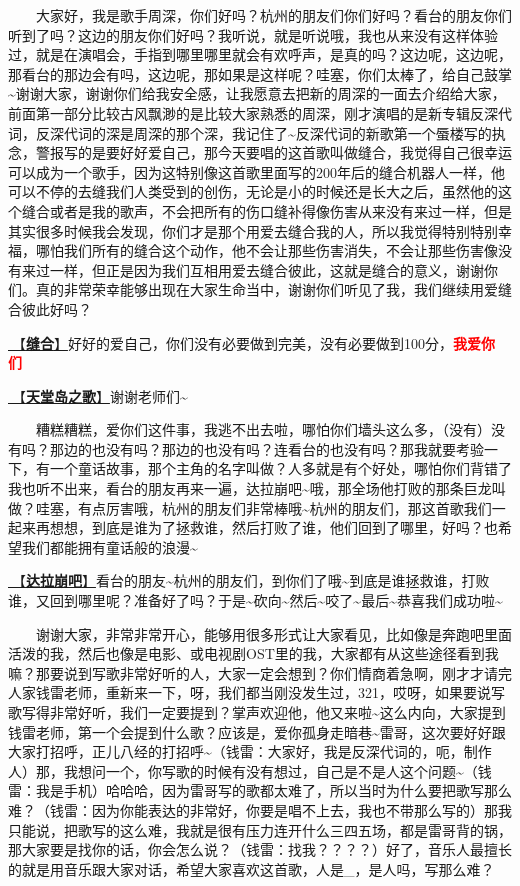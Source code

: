 \documentclass[]{ctexbook}
\begin{document}
  大家好，我是歌手周深，你们好吗？杭州的朋友们你们好吗？看台的朋友你们听到了吗？这边的朋友你们好吗？我听说，就是听说哦，我也从来没有这样体验过，就是在演唱会，手指到哪里哪里就会有欢呼声，是真的吗？这边呢，这边呢，那看台的那边会有吗，这边呢，那如果是这样呢？哇塞，你们太棒了，给自己鼓掌\textasciitilde 谢谢大家，谢谢你们给我安全感，让我愿意去把新的周深的一面去介绍给大家，前面第一部分比较古风飘渺的是比较大家熟悉的周深，刚才演唱的是新专辑反深代词，反深代词的深是周深的那个深，我记住了\textasciitilde 反深代词的新歌第一个蜃楼写的执念，警报写的是要好好爱自己，那今天要唱的这首歌叫做缝合，我觉得自己很幸运可以成为一个歌手，因为这特别像这首歌里面写的200年后的缝合机器人一样，他可以不停的去缝我们人类受到的创伤，无论是小的时候还是长大之后，虽然他的这个缝合或者是我的歌声，不会把所有的伤口缝补得像伤害从来没有来过一样，但是其实很多时候我会发现，你们才是那个用爱去缝合我的人，所以我觉得特别特别幸福，哪怕我们所有的缝合这个动作，他不会让那些伤害消失，不会让那些伤害像没有来过一样，但正是因为我们互相用爱去缝合彼此，这就是缝合的意义，谢谢你们。真的非常荣幸能够出现在大家生命当中，谢谢你们听见了我，我们继续用爱缝合彼此好吗？

\hyperref[fix-you]{🎵【\textbf{缝合}】}好好的爱自己，你们没有必要做到完美，没有必要做到100分，\textbf{\textcolor{red}{我爱你们~} }

\hyperref[haven-song]{🎵【\textbf{天堂岛之歌}】}谢谢老师们\textasciitilde{}

  糟糕糟糕，爱你们这件事，我逃不出去啦，哪怕你们墙头这么多，（没有）没有吗？那边的也没有吗？那边的也没有吗？连看台的也没有吗？那我就要考验一下，有一个童话故事，那个主角的名字叫做？人多就是有个好处，哪怕你们背错了我也听不出来，看台的朋友再来一遍，达拉崩吧\textasciitilde 哦，那全场他打败的那条巨龙叫做？哇塞，有点厉害哦，杭州的朋友们非常棒哦\textasciitilde 杭州的朋友们，那这首歌我们一起来再想想，到底是谁为了拯救谁，然后打败了谁，他们回到了哪里，好吗？也希望我们都能拥有童话般的浪漫\textasciitilde{}

\hyperref[dalabengba]{🎵【\textbf{达拉崩吧}】}看台的朋友\textasciitilde 杭州的朋友们，到你们了哦\textasciitilde 到底是谁拯救谁，打败谁，又回到哪里呢？准备好了吗？于是\textasciitilde 砍向\textasciitilde 然后\textasciitilde 咬了\textasciitilde 最后\textasciitilde 恭喜我们成功啦\textasciitilde{}

  谢谢大家，非常非常开心，能够用很多形式让大家看见，比如像是奔跑吧里面活泼的我，然后也像是电影、或电视剧OST里的我，大家都有从这些途径看到我嘛？那要说到写歌非常好听的人，大家一定会想到？你们情商着急啊，刚才才请完人家钱雷老师，重新来一下，呀，我们都当刚没发生过，321，哎呀，如果要说写歌写得非常好听，我们一定要提到？掌声欢迎他，他又来啦\textasciitilde 这么内向，大家提到钱雷老师，第一个会提到什么歌？应该是，爱你孤身走暗巷\textasciitilde 雷哥，这次要好好跟大家打招呼，正儿八经的打招呼\textasciitilde（钱雷：大家好，我是反深代词的，呃，制作人）那，我想问一个，你写歌的时候有没有想过，自己是不是人这个问题\textasciitilde（钱雷：我是手机）哈哈哈，因为雷哥写的歌都太难了，所以当时为什么要把歌写那么难？（钱雷：因为你能表达的非常好，你要是唱不上去，我也不带那么写的）那我只能说，把歌写的这么难，我就是很有压力连开什么三四五场，都是雷哥背的锅，那大家要是找你的话，你会怎么说？（钱雷：找我？？？？）好了，音乐人最擅长的就是用音乐跟大家对话，希望大家喜欢这首歌，人是\_，是人吗，写那么难？
\end{document}

